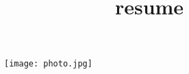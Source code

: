 %
\newcommand{\cvdetail}[1]{
  \begin{tabular*}{1\textwidth}{p{2.5cm} p{14.5cm}}
    & \larrow{bgcol}  #1\\ [3pt]
  \end{tabular*}
}

\newcommand{\mystrut}{\rule[-.3\baselineskip]{0pt}{\baselineskip}}

\title{resume}


\pagestyle{fancy}	


\vspace{-20pt}

\hspace{-0.25\linewidth}\colorbox{bgcol}{
}


\begin{figure}[H]
\begin{flushright}
  \texttt{[image: photo.jpg]}
\end{flushright}
\end{figure}


